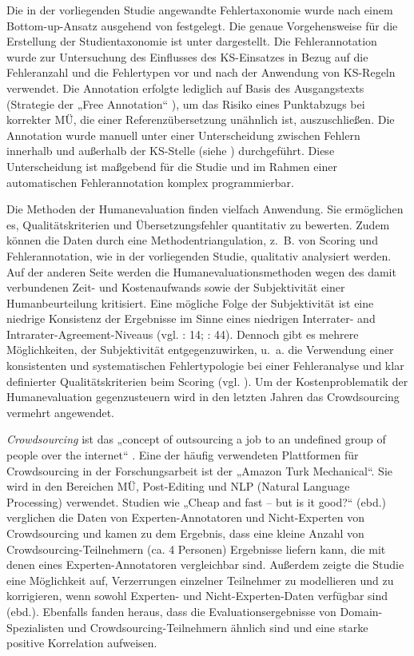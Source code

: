 Die in der vorliegenden Studie angewandte Fehlertaxonomie wurde nach einem Bottom-up-Ansatz ausgehend von \citet{VilarEtAl2006} festgelegt. Die genaue Vorgehensweise für die Erstellung der Studientaxonomie ist unter  dargestellt. Die Fehlerannotation wurde zur Untersuchung des Einflusses des KS-Einsatzes in Bezug auf die Fehleranzahl und die Fehlertypen vor und nach der Anwendung von KS-Regeln verwendet. Die Annotation erfolgte lediglich auf Basis des Ausgangstexts (Strategie der „Free Annotation“ \citep{FishelEtAl2012}), um das Risiko eines Punktabzugs bei korrekter MÜ, die einer Referenzübersetzung unähnlich ist, auszuschließen. Die Annotation wurde manuell unter einer Unterscheidung zwischen Fehlern innerhalb und außerhalb der KS-Stelle (siehe ) durchgeführt. Diese Unterscheidung ist maßgebend für die Studie und im Rahmen einer automatischen Fehlerannotation komplex programmierbar.

Die Methoden der Humanevaluation finden vielfach Anwendung. Sie ermöglichen es, Qualitätskriterien und Übersetzungsfehler quantitativ zu bewerten. Zudem können die Daten durch eine Methodentriangulation, z.~B. von Scoring und Fehlerannotation, wie in der vorliegenden Studie, qualitativ analysiert werden. Auf der anderen Seite werden die Humanevaluationsmethoden wegen des damit verbundenen Zeit- und Kostenaufwands sowie der Subjektivität einer Humanbeurteilung kritisiert. Eine mögliche Folge der Subjektivität ist eine niedrige Konsistenz der Ergebnisse im Sinne eines niedrigen Interrater- and Intrarater-Agreement-Niveaus (vgl. \citealt{Lavie2010}: 14; \citealt{Doherty2012}: 44). Dennoch gibt es mehrere Möglichkeiten, der Subjektivität entgegenzuwirken, u.~a. die Verwendung einer konsistenten und systematischen Fehlertypologie bei einer Fehleranalyse \citep{Flanagan1994} und klar definierter Qualitätskriterien beim Scoring (vgl. \citealt{Doherty2017}). Um der Kostenproblematik der Humanevaluation gegenzusteuern wird in den letzten Jahren das Crowdsourcing vermehrt angewendet.

\textit{Crowdsourcing} ist das „concept of outsourcing a job to an undefined group of people over the internet“ \citep[109]{Gerlach2015}. Eine der häufig verwendeten Plattformen für Crowdsourcing in der Forschungsarbeit ist der „Amazon Turk Mechanical“. Sie wird in den Bereichen MÜ, Post-Editing \citep{MitchellEtAl2014} und NLP (Natural Language Processing) \citep{SnowEtAl2008} verwendet. Studien wie „Cheap and fast – but is it good?“ (ebd.) verglichen die Daten von Experten-Annotatoren und Nicht-Experten von Crowdsourcing und kamen zu dem Ergebnis, dass eine kleine Anzahl von Crowdsourcing-Teilnehmern (ca. 4 Personen) Ergebnisse liefern kann, die mit denen eines Experten-Annotatoren vergleichbar sind. Außerdem zeigte die Studie eine Möglichkeit auf, Verzerrungen einzelner Teilnehmer zu modellieren und zu korrigieren, wenn sowohl Experten- und Nicht-Experten-Daten verfügbar sind (ebd.). Ebenfalls fanden \citet{MitchellEtAl2014} heraus, dass die Evaluationsergebnisse von Domain-Spezialisten und Crowdsourcing-Teilneh\-mern ähnlich sind und eine starke positive Korrelation aufweisen.

